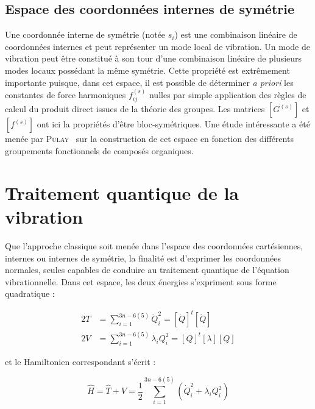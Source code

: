 \subsection{Espace des coordonnées internes de symétrie}

Une coordonnée interne de symétrie (notée $s_i$) est une combinaison linéaire de coordonnées internes et peut représenter un mode local de vibration. Un mode de vibration peut être constitué à son tour d'une combinaison linéaire de plusieurs modes locaux possédant la même symétrie. Cette propriété est extrêmement importante puisque, dans cet espace, il est possible de déterminer \textit{a priori} les constantes de force harmoniques $f^{(s)}_{ij}$ nulles par simple application des règles de calcul du produit direct issues de la théorie des groupes. Les matrices $\left[G^{(s)}\right]$ et $\left[f^{(s)}\right]$ ont ici la propriétés d'être bloc-symétriques. Une étude intéressante a été menée par \textsc{Pulay}~\cite{II-2} sur la construction de cet espace en fonction des différents groupements fonctionnels de composés organiques.


\section{Traitement quantique de la vibration}

Que l'approche classique soit menée dans l'espace des coordonnées cartésiennes, internes ou internes de symétrie, la finalité est d'exprimer les coordonnées normales, seules capables de conduire au traitement quantique de l'équation vibrationnelle. Dans cet espace, les deux énergies s'expriment sous forme quadratique :

\begin{align}
	2T &= \sum^{3n-6(5)}_{i=1} \dot{Q}^2_i = \left[\dot{Q}\right]^t\left[\dot{Q}\right] \\
	2V &= \sum^{3n-6(5)}_{i=1} \lambda_i Q^2_i = \left[Q\right]^t\left[\lambda\right]\left[Q\right]
\end{align}

\noindent et le Hamiltonien correspondant s'écrit :

\begin{equation}
	\hat{H} = \hat{T} + \hat{V} = \frac{1}{2} \sum^{3n-6(5)}_{i=1} \left(\dot{Q}^2_i + \lambda_i Q^2_i\right)
\end{equation}

